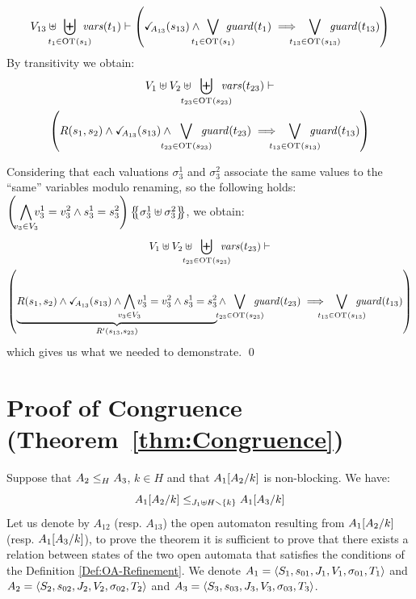 \documentclass[runningheads]{llncs}
\begin{document}
\begin{enumerate}
\begin{multline*}
V_{13}  \uplus \biguplus_\subbox{t_1 \in \fOT{s_1}} \fvars{t_1} \vdash \left( \reach{A_{13}}\mpar{s_{13}} \wedge \bigvee_\subbox{t_1 \in \fOT{s_1}} \fguard{t_1} \implies \bigvee_\subbox{t_{13} \in \fOT{s_{13}}} \fguard{t_{13}} \right)
\end{multline*}
By transitivity  we obtain:
\begin{multline*}
V_1 \uplus V_2 \uplus \biguplus_\subbox{t_{23} \in \fOT{s_{23}}} \fvars{t_{23}} \vdash\\ \left(R\mpar{s_1, s_2} \wedge \reach{A_{13}}\mpar{s_{13}} \wedge \bigvee_\subbox{t_{23} \in \fOT{s_{23}}} \fguard{t_{23}}   \implies \bigvee_\subbox{t_{13} \in \fOT{s_{13}}} \fguard{t_{13}}\right)
\end{multline*}

Considering that each valuations $\sigma_{3}^1$ and $\sigma_{3}^2$ associate the same values to the ``same'' variables modulo renaming, so the following holds:\\ $\left(\,\,{\displaystyle \bigwedge_\subbox{v_3\in V_3} v^1_3=v^2_3\wedge s^1_3 = s^2_3}\right)\psubst{\sigma_{3}^1 \uplus \sigma_{3}^2 }$, we obtain:
\begin{multline*}
V_1 \uplus V_2 \uplus \biguplus_\subbox{t_{23} \in \fOT{s_{23}}} \fvars{t_{23}} \vdash\\ \left(\underbrace{R\mpar{s_1, s_2} \wedge \reach{A_{13}}\mpar{s_{13}} \wedge \bigwedge_\subbox{v_3\in V_3}  v^1_3=v^2_3\wedge s^1_3=s^2_3}_{R^{\prime}(s_{13},s_{23})}  \wedge \bigvee_\subbox{t_{23} \in \fOT{s_{23}}} \fguard{t_{23}}   \implies \bigvee_\subbox{t_{13} \in \fOT{s_{13}}} \fguard{t_{13}}\right)
\end{multline*}
which gives us what we needed to demonstrate. \qed


\end{enumerate}
\section{Proof of Congruence (Theorem~\ref{thm:Congruence})}

Suppose that $\wrel{A_2}{A_3}{H}$, \(k \in H\) and that \(A_1\subst{A_2}{k}\) is non-blocking.
We have: \[\wrel{A_1\subst{A_2}{k}}{A_1\subst{A_3}{k}}{J_1 \uplus H \setminus \mbrc{k}}\]
\proof
Let us denote by $A_{12}$ (resp. $A_{13}$) the open automaton resulting from $A_1\subst{A_2}{k}$ (resp. $A_1\subst{A_3}{k}$),  to prove the theorem it is sufficient to prove that there exists a relation between states of the two open automata that satisfies the conditions of the Definition \ref{Def:OA-Refinement}. We denote $A_1=  \OA{S_1}{s_{01}}{J_1}{V_1}{\sigma_{01}}{T_1}$ and \(A_2 = \OA{S_2}{s_{02}}{J_2}{V_2}{\sigma_{02}}{T_2}\) and $A_3 = \OA{S_3}{s_{03}}{J_3}{V_3}{\sigma_{03}}{T_3}$.
\end{document}
